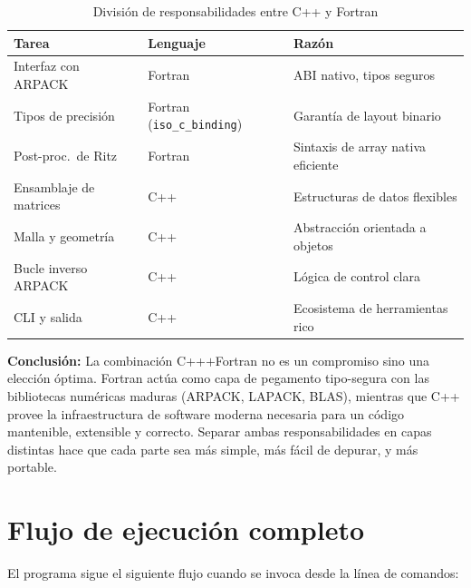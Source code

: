 \documentclass[12pt,a4paper]{article}
\begin{document}
\begin{table}[h]
    \centering
    \caption{División de responsabilidades entre C++ y Fortran}
    \begin{tabular}{@{}p{4cm}p{5cm}p{5cm}@{}}
        \toprule
        \textbf{Tarea} & \textbf{Lenguaje} & \textbf{Razón} \\
        \midrule
        Interfaz con ARPACK & Fortran & ABI nativo, tipos seguros \\
        Tipos de precisión & Fortran (\texttt{iso\_c\_binding}) & Garantía de layout binario \\
        Post-proc.\ de Ritz & Fortran & Sintaxis de array nativa eficiente \\
        Ensamblaje de matrices & C++ & Estructuras de datos flexibles \\
        Malla y geometría & C++ & Abstracción orientada a objetos \\
        Bucle inverso ARPACK & C++ & Lógica de control clara \\
        CLI y salida & C++ & Ecosistema de herramientas rico \\
        \bottomrule
    \end{tabular}
\end{table}

\begin{infobox}
    \textbf{Conclusión:} La combinación C++$+$Fortran no es un compromiso sino una elección óptima. Fortran actúa como capa de pegamento tipo-segura con las bibliotecas numéricas maduras (ARPACK, LAPACK, BLAS), mientras que C++ provee la infraestructura de software moderna necesaria para un código mantenible, extensible y correcto. Separar ambas responsabilidades en capas distintas hace que cada parte sea más simple, más fácil de depurar, y más portable.
\end{infobox}

\section{Flujo de ejecución completo}

El programa sigue el siguiente flujo cuando se invoca desde la línea de comandos:
\end{document}
